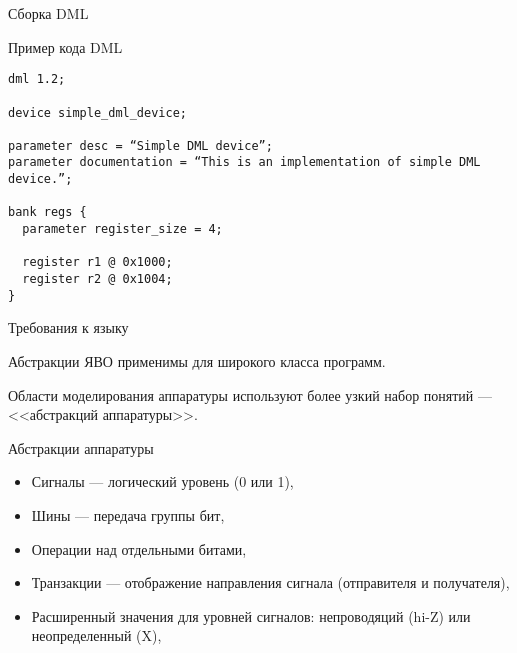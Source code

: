 \begin{frame}{Сборка DML}

\begin{figure}[htp]
    \centering
\end{figure}

\end{frame}

\begin{frame}[fragile]{Пример кода DML}

\begin{lstlisting}
dml 1.2;

device simple_dml_device;

parameter desc = “Simple DML device”;
parameter documentation = “This is an implementation of simple DML device.”;

bank regs {
  parameter register_size = 4;

  register r1 @ 0x1000;
  register r2 @ 0x1004;
}
\end{lstlisting}

\end{frame}

\begin{frame}{Требования к языку}

Абстракции ЯВО применимы для широкого класса программ.

Области моделирования аппаратуры используют более узкий набор понятий --- <<абстракций аппаратуры>>.

\end{frame}

\begin{frame}{Абстракции аппаратуры}

\begin{itemize}
    \item Сигналы --- логический уровень (0 или 1),
    \item Шины --- передача группы бит,
    \item Операции над отдельными битами,
    \item Транзакции --- отображение направления сигнала (отправителя и получателя),
    \item Расширенный значения для уровней сигналов: непроводяций (hi-Z) или неопределенный (X),
\end{itemize}

\end{frame}

